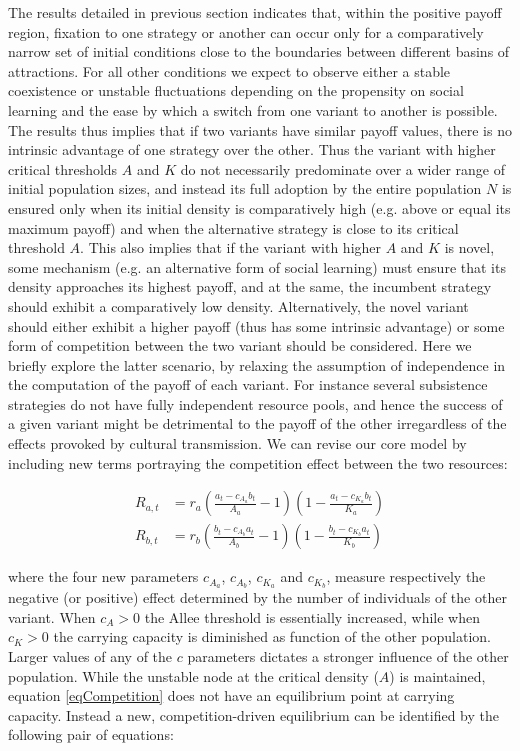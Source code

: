 \documentclass[review,authoryear]{elsarticle}
\begin{document}
The results detailed in previous section indicates that, within the positive payoff region, fixation to one strategy or another can occur only for a comparatively narrow set of initial conditions close to the boundaries between different basins of attractions. For all other conditions we expect to observe either a stable coexistence or unstable fluctuations depending on the propensity on social learning and the ease by which a switch from one variant to another is possible. The results thus implies that if two variants have similar payoff values, there is no intrinsic advantage of one strategy over the other. Thus the variant with higher critical thresholds $A$ and $K$ do not necessarily predominate over a wider range of initial population sizes, and instead its full adoption by the entire population $N$ is ensured only when its initial density is comparatively high (e.g. above or equal its maximum payoff) and when the alternative strategy is close to its critical threshold $A$. This also implies that if the variant with higher $A$ and $K$ is novel, some mechanism (e.g. an alternative form of social learning) must ensure that its density approaches its highest payoff, and at the same, the incumbent strategy should exhibit a comparatively low density. Alternatively, the novel variant should either exhibit a higher payoff (thus has some intrinsic advantage) or some form of competition between the two variant should be considered. Here we briefly explore the latter scenario, by relaxing the assumption of independence in the computation of the payoff of each variant. For instance several subsistence strategies do not have fully independent resource pools, and hence the success of a given variant might be detrimental to the payoff of the other irregardless of the effects provoked by cultural transmission. We can revise our core model by including new terms portraying the competition effect between the two resources:  

\begin{equation}
\begin{aligned}
R_{a,t}& = r_a \left(\frac{a_t-c_{A_a}b_t}{A_a}-1\right)\left(1-\frac{a_t-c_{K_a}b_t}{K_a}\right)\\
R_{b,t}& = r_b  \left(\frac{b_t-c_{A_b}a_t}{A_b}-1\right)\left(1-\frac{b_t-c_{K_b}a_t}{K_b}\right) 
\label{eqCompetition}
\end{aligned}
\end{equation}

where the four new parameters $c_{A_a}$, $c_{A_b}$, $c_{K_a}$ and $c_{K_b}$, measure respectively the negative (or positive) effect determined by the number of individuals of the other variant. 
When $c_{A}>0$ the Allee threshold is essentially increased, while when $c_{K}>0$ the carrying capacity is diminished as function of the other population. 
Larger values of any of the $c$ parameters dictates a stronger influence of the other population. While the unstable node at the critical density ($A$) is maintained, equation \eqref{eqCompetition} does not have an equilibrium point at carrying capacity. Instead a new, competition-driven equilibrium can be identified by the following pair of equations: 
\end{document}
